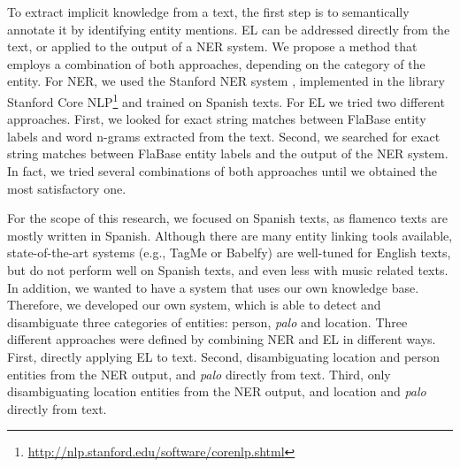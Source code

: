 To extract implicit knowledge from a text, the first step is to semantically annotate it by identifying entity mentions. %
EL can be addressed directly from the text, or applied to the output of a NER system. We propose a method that employs a combination of both approaches, depending on the category of the entity. For NER, we used the Stanford NER system \cite{Finkel2005}, implemented in the library Stanford Core NLP\footnote{\url{http://nlp.stanford.edu/software/corenlp.shtml}} and trained on Spanish texts. For EL we tried two different approaches. First, we looked for exact string matches between FlaBase entity labels and word n-grams extracted from the text. Second, we searched for exact string matches between FlaBase entity labels and the output of the NER system. In fact, we tried several combinations of both approaches until we obtained the most satisfactory one.

For the scope of this research, we focused on Spanish texts, as flamenco texts are mostly written in Spanish. Although there are many entity linking tools available, state-of-the-art systems (e.g., TagMe or Babelfy) are well-tuned for English texts, but do not perform well on Spanish texts, and even less with music related texts. In addition, we wanted to have a system that uses our own knowledge base. Therefore, we developed our own system, which is able to detect and disambiguate three categories of entities: person, \textit{palo} and location. Three different approaches were defined by combining NER and EL in different ways. First, directly applying EL to text. Second, disambiguating location and person entities from the NER output, and \textit{palo} directly from text. Third, only disambiguating location entities from the NER output, and location and \textit{palo} directly from text.

